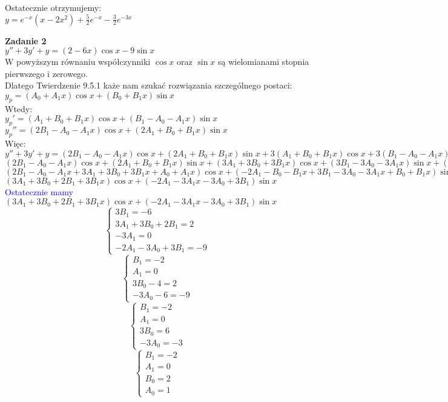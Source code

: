\documentclass[10pt,a4paper]{article}
\begin{document}
	Ostatecznie otrzymujemy: \\
	$y = e^{-x}(x - 2x^2) + \frac{5}{2}e^{-x} - \frac{3}{2}e^{-3x} $
	
	\newpage
	\textbf{Zadanie 2} \\
	$y'' + 3y' + y = (2 - 6x)\cos x - 9\sin x $ \\
	W powyższym równaniu współczynniki $\cos x$ oraz $\sin x$ są wielomianami stopnia pierwszego i zerowego. \\ 
	Dlatego Twierdzenie 9.5.1 każe nam szukać rozwiązania szczególnego postaci:\\
	$y_{p} = (A_{0} + A_{1}x)\cos x + (B_{0} + B_{1}x)\sin x $ \\
	Wtedy: \\
	$y_{p}' = (A_{1} + B_{0} + B_{1}x)\cos x + (B_{1} - A_{0} - A_{1}x)\sin x $ \\
	$y_{p}'' = (2B_{1} - A_{0} - A_{1}x)\cos x + (2A_{1} + B_{0} + B_{1}x)\sin x $ \\
	Więc: \\
	$y'' + 3y' + y = (2B_{1} - A_{0} - A_{1}x)\cos x + (2A_{1} + B_{0} + B_{1}x)\sin x + 3(A_{1} + B_{0} + B_{1}x)\cos x + 3(B_{1} - A_{0} - A_{1}x)\sin x + (A_{0} + A_{1}x)\cos x + (B_{0} + B_{1}x)\sin x = $  $ (2B_{1} - A_{0} - A_{1}x)\cos x + (2A_{1} + B_{0} + B_{1}x)\sin x + (3A_{1} + 3B_{0} + 3B_{1}x)\cos x + (3B_{1} - 3A_{0} - 3A_{1}x)\sin x + (A_{0} + A_{1}x)\cos x + (B_{0} + B_{1}x)\sin x = $  $ (2B_{1} - A_{0} - A_{1}x + 3A_{1} + 3B_{0} + 3B_{1}x + A_{0} + A_{1}x)\cos x +(-2A_{1} - B_{0} - B_{1}x + 3B_{1} - 3A_{0} - 3A_{1}x + B_{0} + B_{1}x)\sin x =  $ $ (3A_{1} + 3B_{0} + 2B_{1} + 3B_{1}x)\cos x + ( - 2A_{1} - 3A_{1}x - 3A_{0} + 3B_{1})\sin x $ \\
	
	\textcolor{blue}{Ostatecznie mamy} \\
	$ (3A_{1} + 3B_{0} + 2B_{1} + 3B_{1}x)\cos x + ( - 2A_{1} - 3A_{1}x - 3A_{0} + 3B_{1})\sin x $\\
	
	$$ 
	\left\{ \begin{array}{l}
	3B_{1}= -6 \\
	3A_{1} + 3B_{0} + 2B_{1} = 2 \\
	-3A_{1} = 0 \\
	-2A_{1} - 3A_{0} + 3B_{1} = -9
	\end{array}\right. 
	$$
	$$ 
	\left\{ \begin{array}{l}
	B_{1}= -2 \\
	A_{1} = 0 \\
	3B_{0} - 4 = 2 \\
	-3A_{0} -6 = -9
	\end{array}\right. 
	$$
	$$ 
	\left\{ \begin{array}{l}
	B_{1}= -2 \\
	A_{1} = 0 \\
	3B_{0} = 6 \\
	-3A_{0} = -3
	\end{array}\right. 
	$$
	$$ 
	\left\{ \begin{array}{l}
	B_{1}= -2 \\
	A_{1} = 0 \\
	B_{0} = 2 \\
	A_{0} = 1
	\end{array}\right. 
	$$
	
\end{document}
